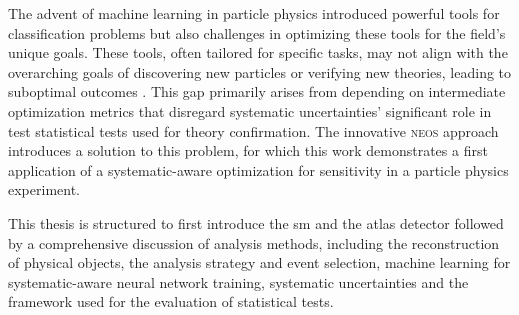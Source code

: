The advent of machine learning in particle physics introduced powerful tools for classification problems but also challenges in optimizing these tools for the field's unique goals. These tools, often tailored for specific tasks, may not align with the overarching goals of discovering new particles or verifying new theories, leading to suboptimal outcomes \citep{guest2018deep}. This gap primarily arises from depending on intermediate optimization metrics that disregard systematic uncertainties' significant role in test statistical tests used for theory confirmation. The innovative \textsc{neos} approach \citep{Simpson_2023} introduces a solution to this problem, for which this work demonstrates a first application of a systematic-aware optimization for sensitivity in a particle physics experiment.

This thesis is structured to first introduce the \ac{sm} and the \ac{atlas} detector followed by a comprehensive discussion of analysis methods, including the reconstruction of physical objects, the analysis strategy and event selection, machine learning for systematic-aware neural network training, systematic uncertainties and the framework used for the evaluation of statistical tests. 













